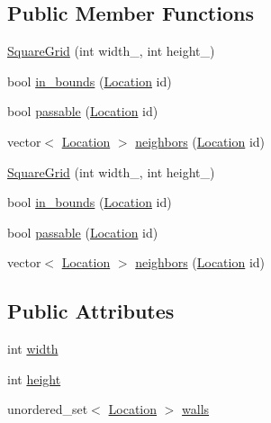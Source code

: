 \subsection*{Public Member Functions}
\begin{DoxyCompactItemize}
\item 
\hyperlink{struct_square_grid_ae5debd1459b89aba9497f270f6d76d7b}{Square\+Grid} (int width\+\_\+, int height\+\_\+)
\item 
bool \hyperlink{struct_square_grid_a84bbaa9dad618228a2d6d3196254b86b}{in\+\_\+bounds} (\hyperlink{struct_square_grid_a2c9a2cbd3912aa48ac97289abc3f1c0f}{Location} id)
\item 
bool \hyperlink{struct_square_grid_a3f638b46510dd880823b1acac75c7b96}{passable} (\hyperlink{struct_square_grid_a2c9a2cbd3912aa48ac97289abc3f1c0f}{Location} id)
\item 
vector$<$ \hyperlink{struct_square_grid_a2c9a2cbd3912aa48ac97289abc3f1c0f}{Location} $>$ \hyperlink{struct_square_grid_a106d76702d8c4acb03883c477db28e3a}{neighbors} (\hyperlink{struct_square_grid_a2c9a2cbd3912aa48ac97289abc3f1c0f}{Location} id)
\item 
\hyperlink{struct_square_grid_ae5debd1459b89aba9497f270f6d76d7b}{Square\+Grid} (int width\+\_\+, int height\+\_\+)
\item 
bool \hyperlink{struct_square_grid_a84bbaa9dad618228a2d6d3196254b86b}{in\+\_\+bounds} (\hyperlink{struct_square_grid_a2c9a2cbd3912aa48ac97289abc3f1c0f}{Location} id)
\item 
bool \hyperlink{struct_square_grid_a3f638b46510dd880823b1acac75c7b96}{passable} (\hyperlink{struct_square_grid_a2c9a2cbd3912aa48ac97289abc3f1c0f}{Location} id)
\item 
vector$<$ \hyperlink{struct_square_grid_a2c9a2cbd3912aa48ac97289abc3f1c0f}{Location} $>$ \hyperlink{struct_square_grid_a106d76702d8c4acb03883c477db28e3a}{neighbors} (\hyperlink{struct_square_grid_a2c9a2cbd3912aa48ac97289abc3f1c0f}{Location} id)
\end{DoxyCompactItemize}
\subsection*{Public Attributes}
\begin{DoxyCompactItemize}
\item 
int \hyperlink{struct_square_grid_af5476cf49f0bb03d1e940adbc6e5febf}{width}
\item 
int \hyperlink{struct_square_grid_ad6b113fc3a49f5db5fbf9c8138e35634}{height}
\item 
unordered\+\_\+set$<$ \hyperlink{struct_square_grid_a2c9a2cbd3912aa48ac97289abc3f1c0f}{Location} $>$ \hyperlink{struct_square_grid_a1bc7e32bd195e42fd9685310d7ee65c5}{walls}
\end{DoxyCompactItemize}
